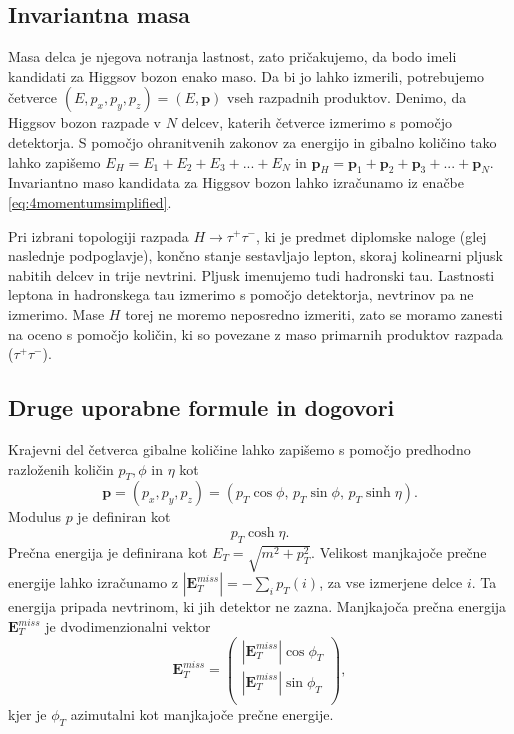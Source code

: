 \documentclass[11pt,a4paper,openany]{book}
\begin{document}
\subsection{Invariantna masa}
Masa delca je njegova notranja lastnost, zato pričakujemo, da bodo imeli kandidati za Higgsov bozon enako maso. Da bi jo lahko izmerili, potrebujemo četverce $(E, p_x, p_y, p_z) = (E, \mathbf{p})$ vseh razpadnih produktov. Denimo, da Higgsov bozon razpade v $N$ delcev, katerih četverce izmerimo s pomočjo detektorja. S pomočjo ohranitvenih zakonov za energijo in gibalno količino tako lahko zapišemo $E_H = E_1 + E_2 + E_3 + ... + E_N$ in $\mathbf{p}_H = \mathbf{p}_1 + \mathbf{p}_2 + \mathbf{p}_3 + ... + \mathbf{p}_N$. Invariantno maso kandidata za Higgsov bozon lahko izračunamo iz enačbe \ref{eq:4momentumsimplified}.

Pri izbrani topologiji razpada $H \rightarrow \tau^+\tau^-$, ki je predmet diplomske naloge (glej naslednje podpoglavje), končno stanje sestavljajo lepton, skoraj kolinearni pljusk nabitih delcev in trije nevtrini. Pljusk imenujemo tudi hadronski tau. Lastnosti leptona in hadronskega tau izmerimo s pomočjo detektorja, nevtrinov pa ne izmerimo. Mase $H$ torej ne moremo neposredno izmeriti, zato se moramo zanesti na oceno s pomočjo količin, ki so povezane z maso primarnih produktov razpada ($\tau^+\tau^-$).

\subsection{Druge uporabne formule in dogovori}

\noindent Krajevni del četverca gibalne količine lahko zapišemo s pomočjo predhodno razloženih količin $p_T, \phi$ in $\eta$ kot
\begin{equation}
\mathbf{p} = \left(p_x, p_y, p_z\right) = \left(p_T \cos \phi,\,p_T \sin \phi,\,p_T \sinh \eta\right).
\label{eq:momentum}
\end{equation}
Modulus $p$ je definiran kot
\begin{equation}
p_T \cosh \eta.
\label{eq:modulus}
\end{equation}
Prečna energija je definirana kot $E_T = \sqrt{m^2 + p_T^2}$. Velikost manjkajoče prečne energije lahko izračunamo z $|\textbf{E}^{miss}_T| = - \sum_i p_T(i)$, za vse izmerjene delce $i$. Ta energija pripada nevtrinom, ki jih detektor ne zazna. Manjkajoča prečna energija $\mathbf{E}^{miss}_T$ je dvodimenzionalni vektor
\begin{equation}
\mathbf{E}^{miss}_T = \left(
\begin{array}{c}
|\mathbf{E}^{miss}_T| \cos \phi_T \\
|\mathbf{E}^{miss}_T| \sin \phi_T \\
\end{array}
\right),
\label{eq:emisst}
\end{equation}
kjer je $\phi_T$ azimutalni kot manjkajoče prečne energije.
\end{document}

